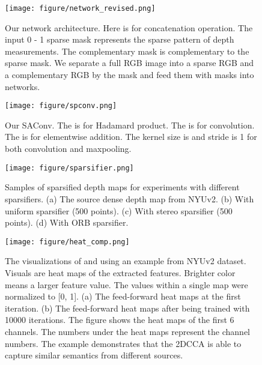 \documentclass{article}
\begin{document}
\begin{figure}[bt!]
    \centering
    \texttt{[image: figure/network\_revised.png]}
    \caption{Our network architecture. Here  is for concatenation operation. The input 0 - 1 sparse mask represents the sparse pattern of depth measurements. The complementary mask is complementary to the sparse mask. We separate a full RGB image into a sparse RGB and a complementary RGB by the mask and feed them with masks into networks.}
    \label{fig:network}
\end{figure}

\begin{figure}[tbp]
\centering
\begin{minipage}[t]{0.4\textwidth}
    \centering
    \texttt{[image: figure/spconv.png]}
    \caption{Our SAConv. The  is for Hadamard product. The  is for convolution. The  is for elementwise addition. The kernel size is  and stride is 1 for both convolution and maxpooling.}
    \label{fig:spconv}
\end{minipage}
\hspace{0.5cm}
\begin{minipage}[t]{0.5\textwidth}
      \centering
    \texttt{[image: figure/sparsifier.png]}
    \caption{Samples of sparsified depth maps for experiments with different sparsifiers. (a) The source dense depth map from NYUv2. (b) With uniform sparsifier (500 points). (c) With stereo sparsifier (500 points). (d) With ORB sparsifier. }
    \label{fig:sparsifier_sample}
\end{minipage}
\end{figure}

\begin{figure}[hbt!]
    \centering
    \texttt{[image: figure/heat\_comp.png]}
    \caption{The visualizations of  and  using an example from NYUv2 dataset. Visuals are heat maps of the extracted features. Brighter color means a larger feature value. The values within a single map were normalized to [0, 1]. (a) The feed-forward heat maps at the first iteration. (b) The feed-forward heat maps after being trained with 10000 iterations. The figure shows the heat maps of the first 6 channels. The numbers under the heat maps represent the channel numbers. The example demonstrates that the 2DCCA is able to capture similar semantics from different sources.}
    \label{fig:heat_comp}
\end{figure}
\end{document}
